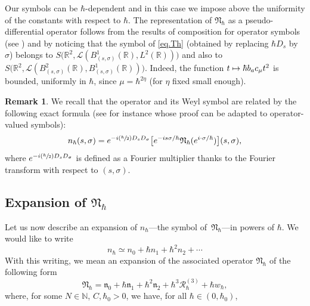 \documentclass[10pt]{amsart}
\newcommand\mto{\mathchoice{\longmapsto}{\mapsto}{\mapsto}{\mapsto}}
\newcommand{\Psfrac}[2]{(\sfrac{#1}{#2})}
\theoremstyle{plain}
\theoremstyle{definition}
\newtheorem{remark}[theorem]{Remark}
\newcommand{\R}{\mathbb{R}}
\begin{document}
Our symbols can be $\hbar$-dependent and in this case we impose above the uniformity of the constants with respect to $\hbar$.\/
The representation of $\mathfrak{N}_{\hbar}$ as a pseudo-differential operator follows from the results of composition for operator symbols (see \cite[Th.\,2.1.12]{Keraval}) and by noticing that the symbol of \eqref{eq.Th} (obtained by replacing $\hbar D_s$ by $\sigma$) belongs to $S\bigl(\R^2,\mathscr{L}(B_{(s,\sigma)}^1(\R),L^2(\R))\bigr)$ and also to $S\bigl(\R^2,\mathscr{L}(B_{(s,\sigma)}^2(\R),B_{(s,\sigma)}^1(\R))\bigr)$. Indeed, the function $t\mto\hbar b_a c_\mu t^2$ is bounded, uniformly in $\hbar$, since $\mu=\hbar^{2\eta}$ (for $\eta$ fixed small enough).

\begin{remark}
We recall that the operator and its Weyl symbol are related by the following exact formula (see for instance \cite[Th.\, 4.19 \& 4.13]{Zworski} whose proof can be adapted to operator-valued symbols):
\[
n_{\hbar}(s,\sigma)=e^{-i\Psfrac\hbar2 D_s D_\sigma} \bigl[e^{-is\sigma/\hbar}\mathfrak{N}_{\hbar} (e^{i\cdot\sigma/\hbar}) \bigr](s,\sigma),
\]
where $e^{-i\Psfrac\hbar2 D_s D_\sigma}$ is defined as a Fourier multiplier thanks to the Fourier transform with respect to $(s,\sigma)$.
\end{remark}

\subsection{Expansion of $\mathfrak{N}_{\hbar}$}
Let us now describe an expansion of $n_{\hbar}$---the symbol of~$\mathfrak{N}_{\hbar}$---in powers of $\hbar$. We would like to write
\begin{equation}\label{eq:exp-symb-Nhc}
n_{\hbar}\simeq n_0+\hbar n_1+\hbar^2n_2+\cdots
\end{equation}
With this writing, we mean an expansion of the associated operator $\mathfrak N_{\hbar}$ of the following form
\begin{equation}\label{eq:ex-Nhc}
\mathfrak{N}_{\hbar}=\mathfrak n_0+\hbar\mathfrak n_1+\hbar^2\mathfrak n_2+\mathcal \hbar^3\mathscr R_\hbar^{(3)}+\hbar w_\hbar,
\end{equation}
where, for some $N\in\mathbb {N}$, $C, \hbar_0>0$, we have, for all $\hbar\in(0,\hbar_0)$,
\end{document}
